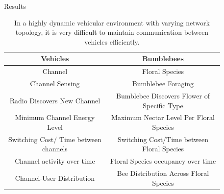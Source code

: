 \documentclass[final]{beamer}
\newlength{\sepwid}
\newlength{\onecolwid}
\newlength{\twocolwid}
\begin{document}
\begin{frame}[t]
\begin{columns}[t]
\begin{column}{\twocolwid}
\begin{columns}[t,totalwidth=\twocolwid]
\begin{column}{\onecolwid}
\end{column} %

\begin{column}{\onecolwid}\vspace{-1in} %

\begin{block}{Results}
\begin{table}
\caption{In a highly dynamic vehicular environment with varying network topology, it is very difficult to maintain communication between vehicles efficiently.}
\centering
\begin{tabular}{c c}
\toprule
\textbf{Vehicles} &\textbf{Bumblebees}\\\hline
Channel & Floral Species\\\hline
Channel Sensing & Bumblebee Foraging\\\hline
Radio Discovers New Channel & Bumblebee Discovers Flower of Specific Type\\\hline
Minimum Channel Energy Level & Maximum Nectar Level Per Floral Species \\\hline
Switching Cost/ Time between channels & Switching Cost/Time between Floral Species\\\hline
Channel activity over time & Floral Species occupancy over time\\\hline
Channel-User Distribution & Bee Distribution Across Floral Species\\
\hline
\bottomrule
\end{tabular}
\end{table}

\end{block}


\end{column} %

\end{columns} %

\end{column} %

\begin{column}{\sepwid}\end{column} %

\begin{column}{\onecolwid}\vspace{-0.8in} %



\end{column}
\end{columns}
\end{frame}
\end{document}
